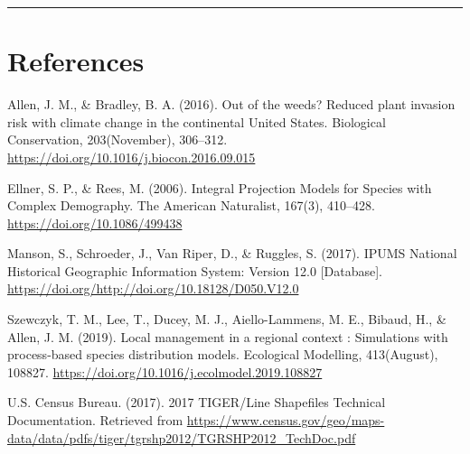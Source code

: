 \documentclass[]{article}
\begin{document}
\begin{center}\rule{0.5\linewidth}{\linethickness}\end{center}

\section{References}

Allen, J. M., \& Bradley, B. A. (2016). Out of the weeds? Reduced plant
invasion risk with climate change in the continental United States.
Biological Conservation, 203(November), 306--312.
\url{https://doi.org/10.1016/j.biocon.2016.09.015}

Ellner, S. P., \& Rees, M. (2006). Integral Projection Models for
Species with Complex Demography. The American Naturalist, 167(3),
410--428. \url{https://doi.org/10.1086/499438}

Manson, S., Schroeder, J., Van Riper, D., \& Ruggles, S. (2017). IPUMS
National Historical Geographic Information System: Version 12.0
{[}Database{]}. \url{https://doi.org/http://doi.org/10.18128/D050.V12.0}

Szewczyk, T. M., Lee, T., Ducey, M. J., Aiello-Lammens, M. E., Bibaud,
H., \& Allen, J. M. (2019). Local management in a regional context :
Simulations with process-based species distribution models. Ecological
Modelling, 413(August), 108827.
\url{https://doi.org/10.1016/j.ecolmodel.2019.108827}

U.S. Census Bureau. (2017). 2017 TIGER/Line Shapefiles Technical
Documentation. Retrieved from
\url{https://www.census.gov/geo/maps-data/data/pdfs/tiger/tgrshp2012/TGRSHP2012_TechDoc.pdf}
\end{document}
